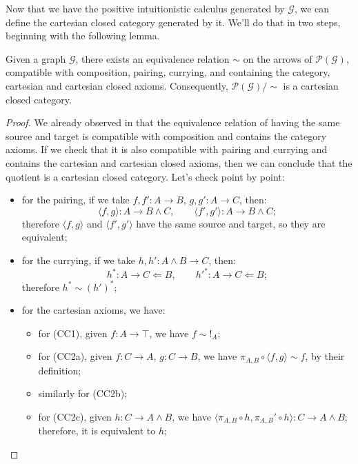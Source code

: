 Now that we have the positive intuitionistic calculus generated by $\mathcal G$, we can define the cartesian closed category generated by it. We'll do that in two steps, beginning with the following lemma.

\begin{lemma}\label{lem:ccc-quotient-existence}
Given a graph $\mathcal G$, there exists an equivalence relation $\sim$ on the arrows of $\mathcal P(\mathcal G)$, compatible with composition,
pairing, currying, and containing the category, cartesian and cartesian closed axioms. Consequently, $\mathcal P(\mathcal G)/{\sim}$ is a cartesian closed category.
\end{lemma}

\begin{proof}
    We already observed in  that the equivalence relation of having the same source and target is compatible with composition and contains the category axioms.
    If we check that it is also compatible with pairing and currying and contains the cartesian and cartesian closed axioms, then we can conclude that the quotient is a cartesian closed category.
    Let's check point by point:
    \begin{itemize}
        \item for the pairing, if we take $f,f' : A \to B$, $g,g' : A \to C$, then:
        \[ \langle f, g \rangle : A \to B \land C, \qquad \langle f',g'\rangle : A \to B \land C; \]
        therefore $\langle f, g \rangle$ and $\langle f',g'\rangle$ have the same source and target, so they are equivalent;
        \item for the currying, if we take $h,h' : A \land B \to C$, then:
        \[ h^* : A \to C \Leftarrow B, \qquad h'^* : A \to C \Leftarrow B; \]
        therefore $h^* \sim (h')^*$;
        \item for the cartesian axioms, we have:
        \begin{itemize}[label=$\ast$]
            \item for (CC1), given $f : A \to \top$, we have $f \sim !_A$;
            \item for (CC2a), given $f : C \to A$, $g : C \to B$, we have $\pi_{A,B} \circ \langle f, g \rangle \sim f$, by their definition;
            \item similarly for (CC2b);
            \item for (CC2c), given $h : C \to A \land B$, we have $\langle \pi_{A,B} \circ h, \pi_{A,B}' \circ h\rangle : C \to A \land B$; therefore, it is equivalent to $h$;

\end{itemize}
\end{itemize}
\end{proof}
